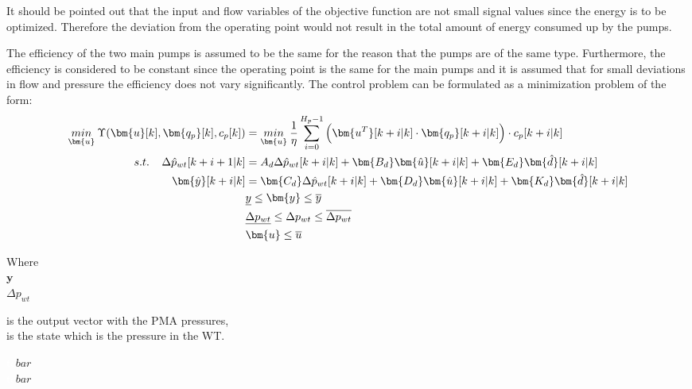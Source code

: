 It should be pointed out that the input and flow variables of the objective function are not small signal values since the energy is to be optimized. Therefore the deviation from the operating point would not result in the total amount of energy consumed up by the pumps. 

The efficiency of the two main pumps is assumed to be the same for the reason that the pumps are of the same type. Furthermore, the efficiency is considered to be constant since the operating point is the same for the main pumps and it is assumed that for small deviations in flow and pressure the efficiency does not vary significantly. 
The control problem can be formulated as a minimization problem of the form:
\begin{align}
\underset{\bm{u}}{min} \:  \Upsilon(\bm{u}[k],\bm{q_p}[k],c_p[k]) &= \underset{\bm{u}}{min} \: \frac{1}{\eta} \sum_{i=0}^{H_p-1} \Big( \bm{u^T}[k+i|k] \cdot \bm{q_{p}}[k+i|k]\Big)\cdot c_p[k+i|k] \label{eqcost1} \\
%
\newline
s.t. \:\:\:\:\:  \Delta \hat{p}_{wt} [k+i+1|k] &= A_d \Delta \hat{p}_{wt}[k+i|k]  + \bm{B_d} \bm{\hat{u}}[k+i|k] + \bm{E_d} \bm{\hat{d}}[k+i|k] \label{dyn}  \\ 
%
\bm{\hat{y}}[k+i|k] &= \bm{C_d} \Delta \hat{p}_{wt}[k+i|k] + \bm{D_d} \bm{\hat{u}}[k+i|k] + \bm{K_d} \bm{\hat{d}}[k+i|k] \\
%
& \underline{y} \leq \bm{y} \leq \overline{y} \\
%
& \underline{\Delta p_{wt}} \leq \Delta p_{wt} \leq \overline{\Delta p_{wt}} \\
%
& \bm{u} \leq \overline{u} \label{eqconst2} 
\end{align}

 \begin{minipage}[t]{0.24\textwidth}
 Where\\
 \hspace*{8mm} $\bm{y}$ \\
 \hspace*{8mm} $\Delta p_{wt}$ 
 \end{minipage}
 \begin{minipage}[t]{0.63\textwidth}
 \vspace*{2mm}
 is the output vector with the PMA pressures,\\
 is the state which is the pressure in the WT.
 \end{minipage}
 \begin{minipage}[t]{0.10\textwidth}
 \vspace*{2mm}
 \textcolor{White}{te}$\unit{bar}$\\
 \textcolor{White}{te}$\unit{bar}$
 \end{minipage}

